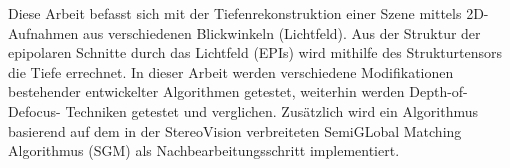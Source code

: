 
Diese Arbeit befasst sich mit der Tiefenrekonstruktion einer Szene mittels 2D-Aufnahmen aus verschiedenen Blickwinkeln (Lichtfeld). Aus der Struktur der epipolaren Schnitte durch das Lichtfeld (EPIs) wird mithilfe des Strukturtensors die Tiefe errechnet. In dieser Arbeit werden verschiedene Modifikationen bestehender entwickelter Algorithmen getestet, weiterhin werden Depth-of-Defocus- Techniken getestet und verglichen. Zusätzlich wird ein Algorithmus basierend auf dem in der StereoVision verbreiteten SemiGLobal Matching Algorithmus (SGM) als Nachbearbeitungsschritt implementiert.
